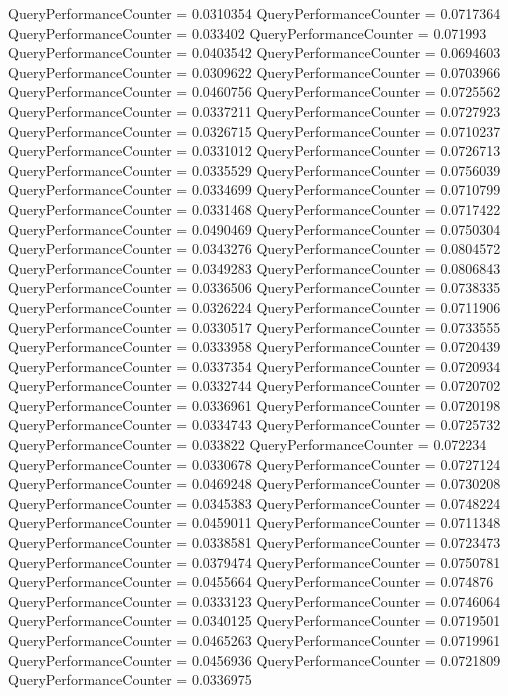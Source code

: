 \documentclass[9pt]{article}
\theoremstyle{plain}
\theoremstyle{definition}
\theoremstyle{remark}
\numberwithin{equation}{section}
\begin{document}
QueryPerformanceCounter  =  0.0310354
QueryPerformanceCounter  =  0.0717364
QueryPerformanceCounter  =  0.033402
QueryPerformanceCounter  =  0.071993
QueryPerformanceCounter  =  0.0403542
QueryPerformanceCounter  =  0.0694603
QueryPerformanceCounter  =  0.0309622
QueryPerformanceCounter  =  0.0703966
QueryPerformanceCounter  =  0.0460756
QueryPerformanceCounter  =  0.0725562
QueryPerformanceCounter  =  0.0337211
QueryPerformanceCounter  =  0.0727923
QueryPerformanceCounter  =  0.0326715
QueryPerformanceCounter  =  0.0710237
QueryPerformanceCounter  =  0.0331012
QueryPerformanceCounter  =  0.0726713
QueryPerformanceCounter  =  0.0335529
QueryPerformanceCounter  =  0.0756039
QueryPerformanceCounter  =  0.0334699
QueryPerformanceCounter  =  0.0710799
QueryPerformanceCounter  =  0.0331468
QueryPerformanceCounter  =  0.0717422
QueryPerformanceCounter  =  0.0490469
QueryPerformanceCounter  =  0.0750304
QueryPerformanceCounter  =  0.0343276
QueryPerformanceCounter  =  0.0804572
QueryPerformanceCounter  =  0.0349283
QueryPerformanceCounter  =  0.0806843
QueryPerformanceCounter  =  0.0336506
QueryPerformanceCounter  =  0.0738335
QueryPerformanceCounter  =  0.0326224
QueryPerformanceCounter  =  0.0711906
QueryPerformanceCounter  =  0.0330517
QueryPerformanceCounter  =  0.0733555
QueryPerformanceCounter  =  0.0333958
QueryPerformanceCounter  =  0.0720439
QueryPerformanceCounter  =  0.0337354
QueryPerformanceCounter  =  0.0720934
QueryPerformanceCounter  =  0.0332744
QueryPerformanceCounter  =  0.0720702
QueryPerformanceCounter  =  0.0336961
QueryPerformanceCounter  =  0.0720198
QueryPerformanceCounter  =  0.0334743
QueryPerformanceCounter  =  0.0725732
QueryPerformanceCounter  =  0.033822
QueryPerformanceCounter  =  0.072234
QueryPerformanceCounter  =  0.0330678
QueryPerformanceCounter  =  0.0727124
QueryPerformanceCounter  =  0.0469248
QueryPerformanceCounter  =  0.0730208
QueryPerformanceCounter  =  0.0345383
QueryPerformanceCounter  =  0.0748224
QueryPerformanceCounter  =  0.0459011
QueryPerformanceCounter  =  0.0711348
QueryPerformanceCounter  =  0.0338581
QueryPerformanceCounter  =  0.0723473
QueryPerformanceCounter  =  0.0379474
QueryPerformanceCounter  =  0.0750781
QueryPerformanceCounter  =  0.0455664
QueryPerformanceCounter  =  0.074876
QueryPerformanceCounter  =  0.0333123
QueryPerformanceCounter  =  0.0746064
QueryPerformanceCounter  =  0.0340125
QueryPerformanceCounter  =  0.0719501
QueryPerformanceCounter  =  0.0465263
QueryPerformanceCounter  =  0.0719961
QueryPerformanceCounter  =  0.0456936
QueryPerformanceCounter  =  0.0721809
QueryPerformanceCounter  =  0.0336975
\end{document}
